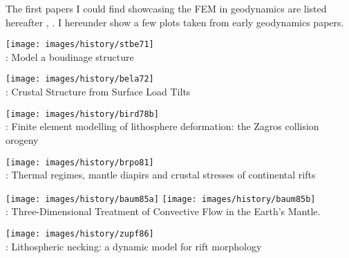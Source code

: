 
The first papers I could find showcasing the FEM in geodynamics are listed hereafter
\cite{gart78}, 
\cite{anbr80}\cite{mera80}\cite{bran80}
\cite{engl82}
\cite{thar85}\cite{scan85}
\cite{enho86}\cite{mofr86}
\cite{zupa86}
\cite{boww89}
\cite{brau94}
\cite{brbe95}.
I hereunder show a few plots taken from early geodynamics papers.


\begin{center}
\begin{minipage}{0.45\textwidth}
\centering
\texttt{[image: images/history/stbe71]}\\
{: Model a boudinage structure \cite{stbe71}}
\end{minipage}\hfill
\begin{minipage}{0.45\textwidth}
\centering
\texttt{[image: images/history/bela72]}\\
{: Crustal Structure from Surface Load Tilts \cite{bela72}}
\end{minipage}
\end{center}

\begin{center}
\begin{minipage}{0.45\textwidth}
\centering
\texttt{[image: images/history/bird78b]}\\
{: Finite element modelling of lithosphere deformation: the Zagros collision 
orogeny \cite{bird78b}}
\end{minipage}\hfill
\begin{minipage}{0.45\textwidth}
\centering
\texttt{[image: images/history/brpo81]}\\
{: Thermal regimes, mantle diapirs and crustal stresses of continental rifts \cite{brpo81}}
\end{minipage}
\end{center}


\begin{center}
\begin{minipage}{0.48\textwidth}
\centering
\texttt{[image: images/history/baum85a]}
\texttt{[image: images/history/baum85b]}\\
{: Three-Dimensional Treatment of Convective Flow in the Earth's Mantle.
\cite{baum85}}
\end{minipage}\hfill
\begin{minipage}{0.45\textwidth}
\centering
\texttt{[image: images/history/zupf86]}\\
{: Lithospheric necking: a dynamic model for rift morphology \cite{zupf86}}
\end{minipage}
\end{center}


